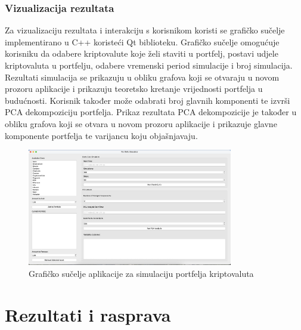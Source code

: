 \documentclass[zavrsnirad]{fer}
\begin{document}
\subsection{Vizualizacija rezultata}
\label{sek:vizualizacija_rezultata}
Za vizualizaciju rezultata i interakciju s korisnikom koristi se
grafičko sučelje implementirano u C++ koristeći Qt biblioteku.
Grafičko sučelje omogućuje korisniku da odabere kriptovalute koje želi
staviti u portfelj, postavi udjele kriptovaluta u portfelju,
odabere vremenski period simulacije i broj simulacija.
Rezultati simulacija se prikazuju u obliku grafova koji
se otvaraju u novom prozoru aplikacije i prikazuju teoretsko kretanje
vrijednosti portfelja u budućnosti. Korisnik također može odabrati
broj glavnih komponenti te izvrši PCA dekompoziciju portfelja. Prikaz
rezultata PCA dekompozicije je također u obliku grafova koji
se otvara u novom prozoru aplikacije i prikazuje glavne komponente
portfelja te varijancu koju objašnjavaju.
\begin{figure}[ht]
    \centering
    \includegraphics[width=0.8\textwidth]{Figures/gui.png}
    \caption{Grafičko sučelje aplikacije za simulaciju portfelja kriptovaluta}
    \label{fig:portfolio_gui}
\end{figure}















\chapter{Rezultati i rasprava}
\label{pog:rezultati_i_rasprava}

\Blindtext

\end{document}
